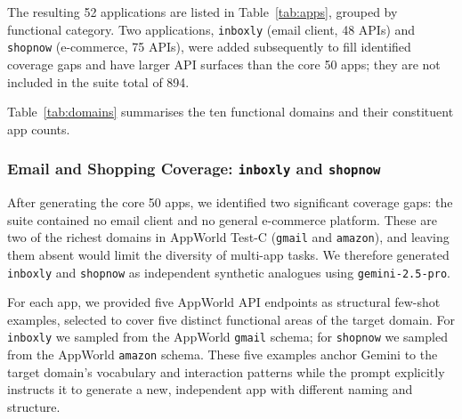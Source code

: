 \documentclass[11pt]{article}
\begin{document}
The resulting 52 applications are listed in Table~\ref{tab:apps}, grouped by functional category. Two applications, \texttt{inboxly} (email client, 48 APIs) and \texttt{shopnow} (e-commerce, 75 APIs), were added subsequently to fill identified coverage gaps and have larger API surfaces than the core 50 apps; they are not included in the suite total of 894.

Table~\ref{tab:domains} summarises the ten functional domains and their constituent app counts.

\subsubsection{Email and Shopping Coverage: \texttt{inboxly} and \texttt{shopnow}}

After generating the core 50 apps, we identified two significant coverage gaps: the suite contained no email client and no general e-commerce platform. These are two of the richest domains in AppWorld Test-C (\texttt{gmail} and \texttt{amazon}), and leaving them absent would limit the diversity of multi-app tasks. We therefore generated \texttt{inboxly} and \texttt{shopnow} as independent synthetic analogues using \texttt{gemini-2.5-pro}.

For each app, we provided five AppWorld API endpoints as structural few-shot examples, selected to cover five distinct functional areas of the target domain. For \texttt{inboxly} we sampled from the AppWorld \texttt{gmail} schema; for \texttt{shopnow} we sampled from the AppWorld \texttt{amazon} schema. These five examples anchor Gemini to the target domain's vocabulary and interaction patterns while the prompt explicitly instructs it to generate a new, independent app with different naming and structure.
\end{document}
